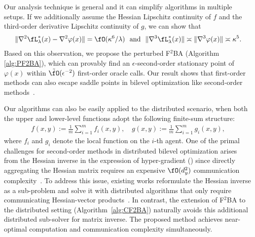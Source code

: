 \documentclass{article}
\begin{document}
Our analysis technique is general and it can simplify algorithms in multiple setups.
If we additionally assume the Hessian Lipschitz continuity of $f$ and the third-order derivative Lipschitz continuity of $g$, we can show that
\begin{align*}
    \Vert \nabla^2 \fL_{\lambda}^*(x) - \nabla^2 \varphi(x) \Vert = \fO(\kappa^6 /\lambda) ~~{\rm and}~~  \Vert \nabla^3 \fL_{\lambda}^*(x) \Vert \asymp \Vert \nabla^3 \varphi(x) \Vert \asymp \kappa^5.
\end{align*} 
Based on this observation, we propose the perturbed F${}^2$BA (Algorithm \ref{alg:PF2BA}), which can provably find an $\epsilon$-second-order stationary point of $\varphi(x)$ within $\tilde \fO(\epsilon^{-2})$ first-order oracle calls.
Our result shows that first-order methods can also escape saddle points in bilevel optimization like second-order methods~\citep{huang2022efficiently}.

Our algorithms can also be easily applied to the distributed scenario, when both the upper and lower-level functions adopt the following finite-sum structure:
\begin{align}  \label{prob:fn}
    f(x,y) := \frac{1}{m} \sum_{i=1}^m f_i(x,y), \quad g(x,y) := \frac{1}{m} \sum_{i=1}^m g_i(x,y),
\end{align}
where $f_i$ and $g_i$ denote the local function on the $i$-th agent. 
One of the primal challenges for second-order methods in distributed bilevel optimization arises from the Hessian inverse in the expression of hyper-gradient () since directly aggregating the Hessian matrix requires an expensive $\fO(d_{y}^2)$ communication complexity~\citep{yangdecentralized,lu2022stochastic}. To address this issue, existing works reformulate the Hessian inverse as a sub-problem and solve it with distributed algorithms that only require communicating Hessian-vector products~\citep{tarzanagh2022fednest,chen2022decentralized,xiao2023communication}.
In contrast, the extension of F${}^2$BA to the distributed setting (Algorithm~\ref{alg:CF2BA}) naturally avoids this additional distributed sub-solver for matrix inverse. The proposed method achieves near-optimal computation and communication complexity simultaneously.
\end{document}
